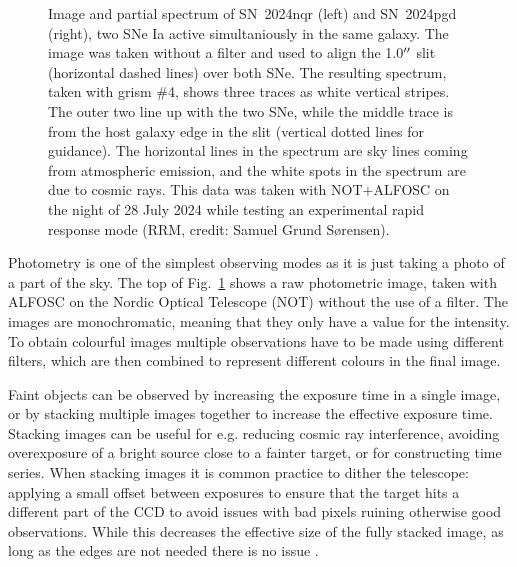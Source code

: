 \documentclass[a4paper,oneside,12pt, class=Latex/Classes/PhDthesisPSnPDF, crop=false]{standalone}
\begin{document}
\begin{figure}
    \caption{Image and partial spectrum of SN~2024nqr (left) and SN~2024pgd (right), two SNe Ia active simultaniously in the same galaxy. The image was taken without a filter and used to align the 1.0$^{\prime\prime}$ slit (horizontal dashed lines) over both SNe. The resulting spectrum, taken with grism \#4, shows three traces as white vertical stripes. The outer two line up with the two SNe, while the middle trace is from the host galaxy edge in the slit (vertical dotted lines for guidance). The horizontal lines in the spectrum are sky lines coming from atmospheric emission, and the white spots in the spectrum are due to cosmic rays. This data was taken with NOT+ALFOSC on the night of 28 July 2024 while testing an experimental rapid response mode (RRM, credit: Samuel Grund S\o rensen).} %
    \label{phot_spec_example}
\end{figure}


Photometry is one of the simplest observing modes as it is just taking a photo of a part of the sky. The top of Fig.~\ref{phot_spec_example} shows a raw photometric image, taken with ALFOSC on the Nordic Optical Telescope (NOT) without the use of a filter. The images are monochromatic, meaning that they only have a value for the intensity. To obtain colourful images multiple observations have to be made using different filters, which are then combined to represent different colours in the final image.

Faint objects can be observed by increasing the exposure time in a single image, or by stacking multiple images together to increase the effective exposure time. Stacking images can be useful for e.g. reducing cosmic ray interference, avoiding overexposure of a bright source close to a fainter target, or for constructing time series. When stacking images it is common practice to dither the telescope: applying a small offset between exposures to ensure that the target hits a different part of the CCD to avoid issues with bad pixels ruining otherwise good observations. While this decreases the effective size of the fully stacked image, as long as the edges are not needed there is no issue \citep{Stacking_I, Stacking_II}.
\end{document}
